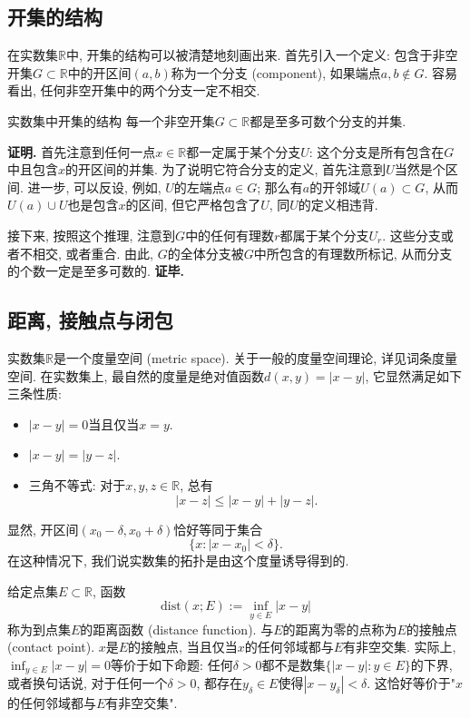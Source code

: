 \subsection{开集的结构}
在实数集$\mathbb{R}$中, 开集的结构可以被清楚地刻画出来. 首先引入一个定义: 包含于非空开集$G\subset\mathbb{R}$中的开区间$(a,b)$称为一个分支 (component), 如果端点$a,b\notin G$. 容易看出, 任何非空开集中的两个分支一定不相交.

\begin{theorem}{实数集中开集的结构}
每一个非空开集$G\subset\mathbb{R}$都是至多可数个分支的并集. 
\end{theorem}
\textbf{证明.} 首先注意到任何一点$x\in\mathbb{R}$都一定属于某个分支$U$: 这个分支是所有包含在$G$中且包含$x$的开区间的并集. 为了说明它符合分支的定义, 首先注意到$U$当然是个区间. 进一步, 可以反设, 例如, $U$的左端点$a\in G$; 那么有$a$的开邻域$U(a)\subset G$, 从而$U(a)\cup U$也是包含$x$的区间, 但它严格包含了$U$, 同$U$的定义相违背.

接下来, 按照这个推理, 注意到$G$中的任何有理数$r$都属于某个分支$U_r$. 这些分支或者不相交, 或者重合. 由此, $G$的全体分支被$G$中所包含的有理数所标记, 从而分支的个数一定是至多可数的. \textbf{证毕.}

\subsection{距离, 接触点与闭包}
实数集$\mathbb{R}$是一个度量空间 (metric space). 关于一般的度量空间理论, 详见词条度量空间. 在实数集上, 最自然的度量是绝对值函数$d(x,y)=|x-y|$, 它显然满足如下三条性质:

\begin{itemize}
\item $|x-y|=0$当且仅当$x=y$.
\item $|x-y|=|y-z|$.
\item 三角不等式: 对于$x,y,z\in\mathbb{R}$, 总有
$$
|x-z|\leq|x-y|+|y-z|.
$$
\end{itemize}

显然, 开区间$(x_0-\delta,x_0+\delta)$恰好等同于集合
$$
\{x:|x-x_0|<\delta\}.
$$
在这种情况下, 我们说实数集的拓扑是由这个度量诱导得到的.

给定点集$E\subset\mathbb{R}$, 函数
$$
\text{dist}(x;E):=\inf_{y\in E}|x-y|
$$
称为到点集$E$的距离函数 (distance function). 与$E$的距离为零的点称为$E$的接触点 (contact point). $x$是$E$的接触点, 当且仅当$x$的任何邻域都与$E$有非空交集. 实际上, $\inf_{y\in E}|x-y|=0$等价于如下命题: 任何$\delta>0$都不是数集$\{|x-y|:y\in E\}$的下界, 或者换句话说, 对于任何一个$\delta>0$, 都存在$y_\delta\in E$使得$|x-y_\delta|<\delta$. 这恰好等价于"$x$的任何邻域都与$E$有非空交集".


